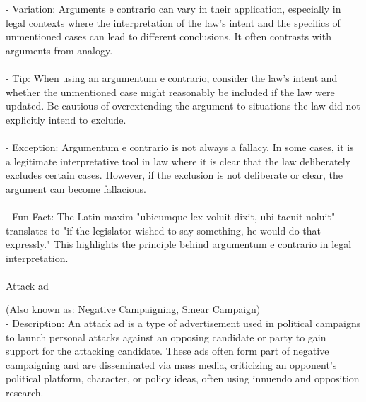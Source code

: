 \documentclass[a4paper,12pt,single,pdftex]{scrbook}
\begin{document}
    
      - Variation: Arguments e contrario can vary in their application, especially in legal contexts where the interpretation of the law's intent and the specifics of unmentioned cases can lead to different conclusions. It often contrasts with arguments from analogy.
    \\

    
      
    \\

    
      - Tip: When using an argumentum e contrario, consider the law's intent and whether the unmentioned case might reasonably be included if the law were updated. Be cautious of overextending the argument to situations the law did not explicitly intend to exclude.
    \\

    
      
    \\

    
      - Exception: Argumentum e contrario is not always a fallacy. In some cases, it is a legitimate interpretative tool in law where it is clear that the law deliberately excludes certain cases. However, if the exclusion is not deliberate or clear, the argument can become fallacious.
    \\

    
      
    \\

    
      - Fun Fact: The Latin maxim "ubicumque lex voluit dixit, ubi tacuit noluit" translates to "if the legislator wished to say something, he would do that expressly." This highlights the principle behind argumentum e contrario in legal interpretation.
    \\

    
      
    \\

  

Attack ad
    
      (Also known as: Negative Campaigning, Smear Campaign)
    \\

  
    
      - Description: An attack ad is a type of advertisement used in political campaigns to launch personal attacks against an opposing candidate or party to gain support for the attacking candidate. These ads often form part of negative campaigning and are disseminated via mass media, criticizing an opponent's political platform, character, or policy ideas, often using innuendo and opposition research.
    \\
\end{document}
